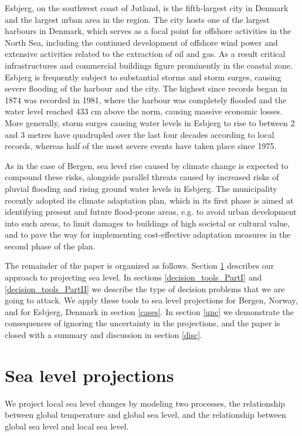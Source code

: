 \documentclass[draft,linenumbers]{agujournal}
\begin{document}
Esbjerg, on the southwest coast of Jutland, is the fifth-largest city in Denmark and the largest urban area in the region. The city hosts one of the largest harbours  in Denmark, which serves as a focal point for offshore activities in the North Sea, including the continued development of offshore wind power and extensive activities related to the extraction of oil and gas. As a result critical infrastructures and commercial buildings figure prominently in the coastal zone. Esbjerg is frequently subject to substantial storms and storm surges, causing severe flooding of the harbour and the city. The highest since records began in 1874 was recorded in 1981, where the harbour was completely flooded and the water level reached  433 cm above the norm, causing massive economic losses.  More generally, storm surges causing water levels in Esbjerg to rise to between 2 and 3 metres have quadrupled over the last four decades according to local records, whereas half of the most severe events have taken place since 1975.

As in the case of Bergen, sea level rise caused by climate change is expected to compound these risks, alongside parallel threats caused by increased risks of pluvial flooding and rising ground water levels in Esbjerg. The municipality recently adopted its climate adaptation plan, which in its first phase is aimed at identifying present and future flood-prone areas, e.g. to avoid urban development into such areas, to limit damages to buildings of high societal or cultural value, and to pave the way for implementing cost-effective adaptation measures in the second phase of the plan.   

The remainder of the paper is organized as follows. Section \ref{sealevelproj} describes our approach to projecting sea level. In sections \ref{decision_tools_PartI} and \ref{decision_tools_PartII} we describe the type of decision problems that we are going to attack. We apply these tools to sea level projections for Bergen, Norway, and for Esbjerg, Denmark in section \ref{cases}. In section \ref{unc} we demonstrate the consequences of ignoring the uncertainty in the projections, and the paper is closed with a summary and discussion in section \ref{disc}.

\section{Sea level projections}
\label{sealevelproj}

We project local sea level changes by modeling two processes, the relationship between global temperature and global sea level, and the relationship between global sea level and local sea level.
\end{document}
